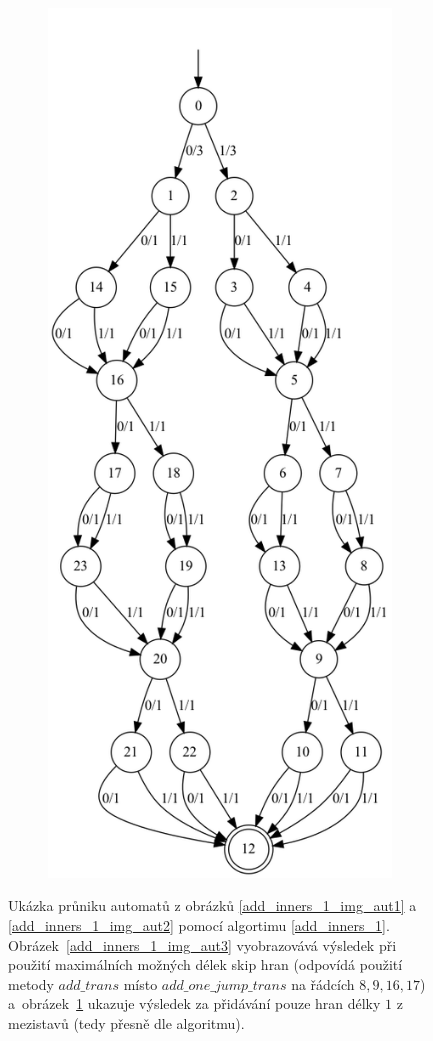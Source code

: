 \begin{figure}
\begin{subfigure}{0.24\textwidth}
        \includegraphics[scale=0.22]{obrazky-figures/add_inners_1_img_aut4.png}
        \caption{}
        \label{add_inners_1_img_aut4}
    \end{subfigure}
    \caption{Ukázka průniku automatů z obrázků \ref{add_inners_1_img_aut1} a \ref{add_inners_1_img_aut2} pomocí algortimu \ref{add_inners_1}. Obrázek~\ref{add_inners_1_img_aut3} vyobrazovává výsledek při použití maximálních možných délek skip hran (odpovídá použití metody $add\_trans$ místo $add\_one\_jump\_trans$ na řádcích $8,9,16,17$) a~obrázek~\ref{add_inners_1_img_aut4} ukazuje výsledek za přidávání pouze hran délky $1$ z mezistavů (tedy přesně dle algoritmu).}
    \label{add_inners_1_img}
\end{figure}

